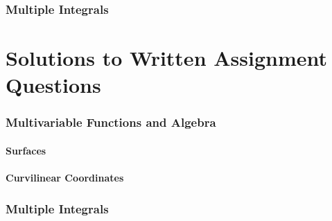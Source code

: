 \documentclass{article}
\begin{document}
\section{Multiple Integrals}


\newpage
\part{Solutions to Written Assignment Questions}
\setcounter{section}{1}

\section{Multivariable Functions and Algebra}

\newpage %

\newpage %
\subsection{Surfaces}
\newpage %
\subsection{Curvilinear Coordinates}
\newpage %

\newpage %

\newpage %


\section{Multiple Integrals}

\end{document}

